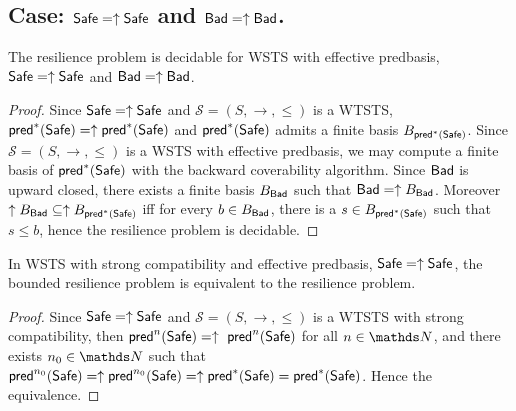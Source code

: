\iffalse

\begin{proposition}\label{general}
\textcolor{red}{
$\mathscr{S}=(S,\rightarrow,\leq)$ is %
(\Bad,\Safe)-bounded-resilient iff $\mathscr{S}=(S,\rightarrow,\leq)$ is %
(\Bad,\Safe)-resilient (CONJECTURE FOR NOW)
}
\end{proposition}

\begin{proof}
Resilient means that ...
\end{proof}

\fi


\subsection{Case: $\textsf{Safe}=\uparrow \textsf{Safe}$ and $\textsf{Bad}=\uparrow \textsf{Bad}$.}




\begin{theorem}\label{up-up}
The resilience problem is decidable for WSTS with effective predbasis, $\textsf{Safe}=\uparrow \textsf{Safe}$
and $\textsf{Bad}=\uparrow \textsf{Bad}$.

\end{theorem}


\begin{proof}
Since $\textsf{Safe}=\uparrow \textsf{Safe}$ and
$\mathscr{S}=(S,\rightarrow,\leq)$ is a WTSTS,  $\textsf{pred}^*(\textsf{Safe})=\uparrow \textsf{pred}^*(\textsf{Safe})$ and $\textsf{pred}^*(\textsf{Safe})$ admits a finite basis $B_{\textsf{pred}^*(\textsf{Safe})}$. Since $\mathscr{S}=(S,\rightarrow,\leq)$ is a WSTS  with effective predbasis, we may compute a finite basis of $\textsf{pred}^*(\textsf{Safe})$ with the backward coverability algorithm. 
Since $\textsf{Bad}$  is upward closed, there exists a finite basis $B_{\textsf{Bad}}$ such that $\textsf{Bad} = \uparrow B_{\textsf{Bad}}$. Moreover $ \uparrow B_{\textsf{Bad}} \subseteq \uparrow B_{\textsf{pred}^*(\textsf{Safe})}$ iff for every $b \in B_{\textsf{Bad}}$, there is a $s \in B_{\textsf{pred}^*(\textsf{Safe})}$ such that $s \leq b$,
hence the resilience problem is decidable.
\end{proof}

\begin{proposition}
In WSTS with strong compatibility and effective predbasis,  $\textsf{Safe}=\uparrow \textsf{Safe}$, the bounded resilience problem is equivalent to the resilience problem.
\end{proposition}

\begin{proof}
Since $\textsf{Safe}=\uparrow \textsf{Safe}$ and
$\mathscr{S}=(S,\rightarrow,\leq)$ is a WTSTS with strong %
compatibility, then $\textsf{pred}^n(\textsf{Safe})= \uparrow~\textsf{pred}^n(\textsf{Safe})$ for all $n \in \N$,
and there exists $n_0 \in \N$ such that 
$\textsf{pred}^{n_0}(\textsf{Safe}) = \uparrow \textsf{pred}^{n_0}(\textsf{Safe}) = \uparrow \textsf{pred}^*(\textsf{Safe}) = \textsf{pred}^*(\textsf{Safe})$.
Hence the equivalence.
\end{proof}

